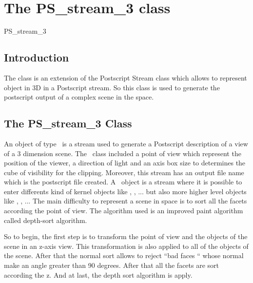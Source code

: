 
\chapter{The PS\_stream\_3 class}

\begin{ccClass} {PS_stream_3}

\section{Introduction}

The class  is an extension of the Postscript Stream
class which allows to represent object in 3D in a Postscript stream.
So this class is used to generate the postscript output of a complex
scene in the space.

\section{The PS\_stream\_3 Class}

\ccDefinition 

An object of type \ccClassName\ is a stream used to generate a
Postscript description of a view of a 3 dimension scene.
The \ccClassName\ class included a
point of view which represent the position of the viewer, a direction
of light and an axis box size to determines the cube of visibility for the
clipping.
Moreover, this stream has an output file name which is the postscript file
created.
A \ccClassName\ object is a stream where it is possible to enter
differents kind of kernel objects like ,
, ... but also more higher level objects like , , ...
The main difficulty to represent a scene in space is to sort all the
facets according the point of view.
The algorithm used is an improved paint algorithm called depth-sort
algorithm.



So to begin, the first step is to transform the point of view and the
objects of the scene in an 
z-axis view. This transformation is also applied to all of the objects of 
the scene.
After that the normal sort allows to reject ``bad faces `` whose
normal make an angle greater than 90 degrees.
After that all the facets are sort according the z.
And at last, the depth sort algorithm is apply.


\end{ccClass}
